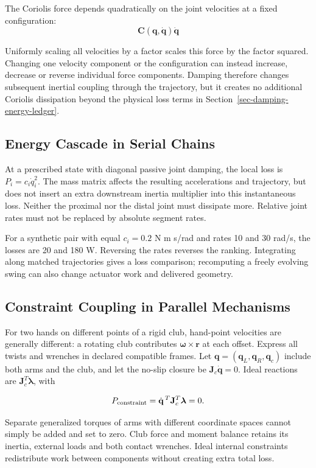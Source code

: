 The Coriolis force depends quadratically on the joint velocities at a fixed configuration: \[
\bm C(\bm{q}, \dot{\bm{q}}) \dot{\bm{q}}
\]

Uniformly scaling all velocities by a factor scales this force by the factor squared. Changing one velocity component or the configuration can instead increase, decrease or reverse individual force components. Damping therefore changes subsequent inertial coupling through the trajectory, but it creates no additional Coriolis dissipation beyond the physical loss terms in Section~\ref{sec-damping-energy-ledger}. \subsection{Energy Cascade in Serial Chains}\label{energy-cascade-in-serial-chains}

At a prescribed state with diagonal passive joint damping, the local loss is \(P_i=c_i\dot q_i^2\). The mass matrix affects the resulting accelerations and trajectory, but does not insert an extra downstream inertia multiplier into this instantaneous loss. Neither the proximal nor the distal joint must dissipate more. Relative joint rates must not be replaced by absolute segment rates.

For a synthetic pair with equal \(c_i=0.2\) N m s/rad and rates 10 and 30 rad/s, the losses are 20 and 180 W. Reversing the rates reverses the ranking. Integrating along matched trajectories gives a loss comparison; recomputing a freely evolving swing can also change actuator work and delivered geometry.

\subsection{Constraint Coupling in Parallel
Mechanisms}\label{constraint-coupling-in-parallel-mechanisms}

For two hands on different points of a rigid club, hand-point velocities are generally different: a rotating club contributes \(\boldsymbol\omega\times\mathbf r\) at each offset. Express all twists and wrenches in declared compatible frames. Let \(\mathbf q=(\mathbf q_L,\mathbf q_R,\mathbf q_c)\) include both arms and the club, and let the no-slip closure be \(\mathbf J_c\dot{\mathbf q}=0\). Ideal reactions are \(\mathbf J_c^T\boldsymbol\lambda\), with

\[
P_{\rm constraint}=\dot{\mathbf q}^{\,T}\mathbf J_c^T\boldsymbol\lambda=0.
\]

Separate generalized torques of arms with different coordinate spaces cannot simply be added and set to zero. Club force and moment balance retains its inertia, external loads and both contact wrenches. Ideal internal constraints redistribute work between components without creating extra total loss.

